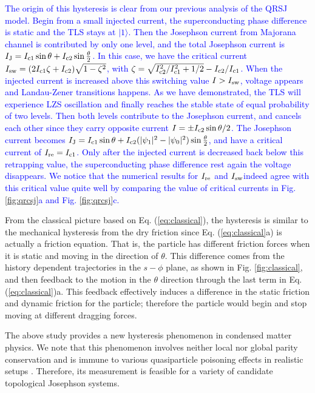 \documentclass[aps,prl,twocolumn,showpacs,showpacs,10pt,superscriptaddress]{revtex4-1}
\newcommand{\blue}[1]{\textcolor{blue}{#1}}
\begin{document}
\blue{The origin of this hysteresis is clear from our previous analysis of the QRSJ model. Begin from a small injected current, the superconducting phase difference is static and the TLS stays at $|1\rangle$. Then the Josephson current from Majorana channel is contributed by only one level, and the total Josephson current is $I_{\rm J}=I_{\rm c1}\sin{\theta}+I_{\rm c2}\sin{\frac{\theta}{2}}$. In this case, we have the critical current $I_{\rm sw} = (2I_{\rm c1}  \zeta  + I_{\rm c2}   ) \sqrt{1- \zeta^2}$, with $\zeta =\sqrt{I_{\rm c2}^2/I_{\rm c1}^2 + {1}/{2}} - I_{\rm c2}/I_{\rm c1}$. When the injected current is increased above this switching value $I>I_{\rm sw}$, voltage appears and Landau-Zener transitions happens. As we have demonstrated, the TLS will experience LZS oscillation and finally reaches the stable state of equal probability of two levels. Then both levels contribute to the Josephson current, and cancels each other since they carry opposite current $I= \pm I_{\rm c2} \sin \theta/2 $. The Josephson current becomes $I_{\rm J}=I_{\rm c1}\sin{\theta}+I_{\rm c2}(|\psi_1|^2 - |\psi_0|^2)\sin{\frac{\theta}{2}}$, and have a critical current of $I_{\rm re} = I_{\rm c1}$. Only after the injected current is decreased back below this retrapping value, the superconducting phase difference rest again the voltage disappears. We notice that the numerical results for $I_{\rm re}$ and $I_{\rm sw}$indeed agree with this critical value quite well by comparing the value of critical currents in Fig. \ref{fig:qrcsj}a and Fig. \ref{fig:qrcsj}c. }




From the classical picture based on Eq. (\ref{eq:classical}), the hysteresis is similar to the mechanical hysteresis from the dry friction \cite{wojewoda} since Eq. (\ref{eq:classical}a) is actually a friction equation. That is, the particle has different friction forces when it is static and moving in the direction of $\theta$. This difference comes from the history dependent trajectories in the $s-\phi$ plane, as shown in Fig. \ref{fig:classical}, and then feedback to the motion in the $\theta$ direction through the last term in Eq. (\ref{eq:classical})a. This feedback effectively induces a difference in the static friction and dynamic friction for the particle; therefore the particle would begin and stop moving at different dragging forces.


The above study provides a new hysteresis phenomenon in condensed matter physics. We note that this phenomenon involves neither local nor global parity conservation and is immune to various quasiparticle poisoning effects in realistic setups \cite{supplement,yangpeng}. Therefore, its measurement is feasible for a variety of candidate topological Josephson systems.
\end{document}
